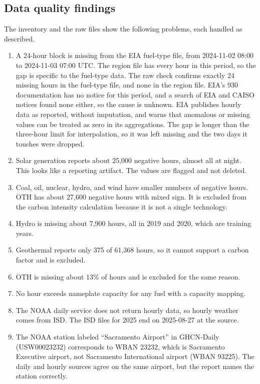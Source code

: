 \documentclass[10pt,journal,compsoc]{IEEEtran}
\begin{document}
\subsection{Data quality findings}
The inventory and the raw files show the following problems, each handled as described.
\begin{enumerate}
\item A 24-hour block is missing from the EIA fuel-type file, from 2024-11-02 08:00 to 2024-11-03 07:00 UTC. The region file has every hour in this period, so the gap is specific to the fuel-type data. The raw check confirms exactly 24 missing hours in the fuel-type file, and none in the region file. EIA's 930 documentation has no notice for this period, and a search of EIA and CAISO notices found none either, so the cause is unknown. EIA publishes hourly data as reported, without imputation, and warns that anomalous or missing values can be treated as zero in its aggregations. The gap is longer than the three-hour limit for interpolation, so it was left missing and the two days it touches were dropped.
\item Solar generation reports about 25,000 negative hours, almost all at night. This looks like a reporting artifact. The values are flagged and not deleted.
\item Coal, oil, nuclear, hydro, and wind have smaller numbers of negative hours. OTH has about 27,600 negative hours with mixed sign. It is excluded from the carbon intensity calculation because it is not a single technology.
\item Hydro is missing about 7,900 hours, all in 2019 and 2020, which are training years.
\item Geothermal reports only 375 of 61,368 hours, so it cannot support a carbon factor and is excluded.
\item OTH is missing about 13\% of hours and is excluded for the same reason.
\item No hour exceeds nameplate capacity for any fuel with a capacity mapping.
\item The NOAA daily service does not return hourly data, so hourly weather comes from ISD. The ISD files for 2025 end on 2025-08-27 at the source.
\item The NOAA station labeled ``Sacramento Airport'' in GHCN-Daily (USW00023232) corresponds to WBAN 23232, which is Sacramento Executive airport, not Sacramento International airport (WBAN 93225). The daily and hourly sources agree on the same airport, but the report names the station correctly.
\end{enumerate}
\end{document}

